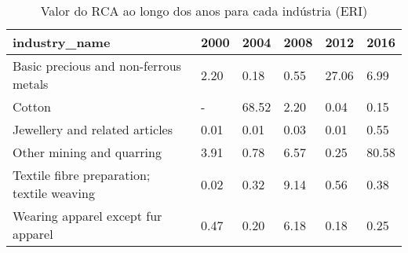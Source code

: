 \begin{table}
\centering
\caption{Valor do RCA ao longo dos anos para cada indústria (ERI)}
\begin{tabular}{p{6cm}p{1.5cm}p{1.5cm}p{1.5cm}p{1.5cm}p{1.5cm}}
\toprule
                             industry\_name & 2000 &  2004 & 2008 &  2012 &  2016 \\
\midrule
     Basic precious and non-ferrous metals & 2.20 &  0.18 & 0.55 & 27.06 &  6.99 \\
                                    Cotton &    - & 68.52 & 2.20 &  0.04 &  0.15 \\
            Jewellery and related articles & 0.01 &  0.01 & 0.03 &  0.01 &  0.55 \\
                 Other mining and quarring & 3.91 &  0.78 & 6.57 &  0.25 & 80.58 \\
Textile fibre preparation; textile weaving & 0.02 &  0.32 & 9.14 &  0.56 &  0.38 \\
        Wearing apparel except fur apparel & 0.47 &  0.20 & 6.18 &  0.18 &  0.25 \\
\bottomrule
\end{tabular}
\end{table}

